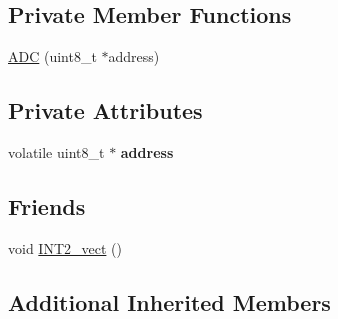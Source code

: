 \subsection*{Private Member Functions}
\begin{DoxyCompactItemize}
\item 
\hyperlink{class_a_d_c_ab20b8e5645442615d875d2cef89bc488}{A\-D\-C} (uint8\-\_\-t $\ast$address)
\end{DoxyCompactItemize}
\subsection*{Private Attributes}
\begin{DoxyCompactItemize}
\item 
\hypertarget{class_a_d_c_aa58c27581281db4bd8537df9ea2b49f2}{volatile uint8\-\_\-t $\ast$ {\bfseries address}}\label{class_a_d_c_aa58c27581281db4bd8537df9ea2b49f2}

\end{DoxyCompactItemize}
\subsection*{Friends}
\begin{DoxyCompactItemize}
\item 
void \hyperlink{class_a_d_c_a8f7964aad4550f29972483135452c811}{I\-N\-T2\-\_\-vect} ()
\end{DoxyCompactItemize}
\subsection*{Additional Inherited Members}


